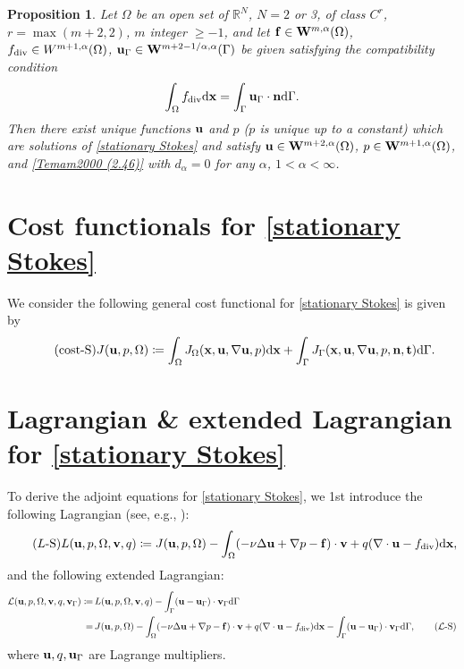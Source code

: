 \documentclass[oneside]{book}
\numberwithin{equation}{section}
\newtheorem{proposition}{Proposition}[section]
\begin{document}
\begin{proposition}
    Let $\Omega$ be an open set of $\mathbb{R}^N$, $N = 2$ or 3, of class $C^r$, $r = \max(m + 2,2)$, $m$ integer $\ge -1$, and let ${\bf f}\in{\bf W}^{m,\alpha}(\Omega)$, $f_{\rm div}\in W^{m+1,\alpha}(\Omega)$, ${\bf u}_\Gamma\in{\bf W}^{m + 2 - 1/\alpha,\alpha}(\Gamma)$ be given satisfying the compatibility condition
    \begin{align*}
        \int_\Omega f_{\rm div}{\rm d}{\bf x} = \int_\Gamma {\bf u}_\Gamma\cdot{\bf n}{\rm d}\Gamma.
    \end{align*}
    Then there exist unique functions ${\bf u}$ and $p$ ($p$ is unique up to a constant) which are solutions of \eqref{stationary Stokes} and satisfy ${\bf u}\in{\bf W}^{m+2,\alpha}(\Omega)$, $p\in{\bf W}^{m+1,\alpha}(\Omega)$, and \eqref{Temam2000 (2.46)} with $d_\alpha = 0$ for any $\alpha$, $1 < \alpha < \infty$.
\end{proposition}

\section{Cost functionals for \eqref{stationary Stokes}}
We consider the following general cost functional for \eqref{stationary Stokes} is given by
\begin{align}
    \label{cost functional for stationary Stokes}
    \tag{cost-S}
    J({\bf u},p,\Omega)\coloneqq\int_\Omega J_\Omega({\bf x},{\bf u},\nabla{\bf u},p){\rm d}{\bf x} + \int_\Gamma J_\Gamma({\bf x},{\bf u},\nabla{\bf u},p,{\bf n},{\bf t}){\rm d}\Gamma.
\end{align}

\section{Lagrangian \& extended Lagrangian for \eqref{stationary Stokes}}
To derive the adjoint equations for \eqref{stationary Stokes}, we 1st introduce the following Lagrangian (see, e.g., \cite{Troltzsch2010}):
\begin{align}
    \label{Lagrangian for stationary Stokes}
    \tag{$L$-S}
    L({\bf u},p,\Omega,{\bf v},q)\coloneqq J({\bf u},p,\Omega) - \int_\Omega (-\nu\Delta{\bf u} + \nabla p - {\bf f})\cdot{\bf v} + q(\nabla\cdot{\bf u} - f_{\rm div}){\rm d}{\bf x},
\end{align}
and the following extended Lagrangian:
\begin{align}
    \mathcal{L}({\bf u},p,\Omega,{\bf v},q,{\bf v}_\Gamma)\coloneqq&\,L({\bf u},p,\Omega,{\bf v},q) - \int_\Gamma ({\bf u} - {\bf u}_\Gamma)\cdot{\bf v}_\Gamma{\rm d}\Gamma\nonumber\\
    =&\, J({\bf u},p,\Omega) - \int_\Omega (-\nu\Delta{\bf u} + \nabla p - {\bf f})\cdot{\bf v} + q(\nabla\cdot{\bf u} - f_{\rm div}){\rm d}{\bf x} - \int_\Gamma ({\bf u} - {\bf u}_\Gamma)\cdot{\bf v}_\Gamma{\rm d}\Gamma,\label{extended Lagrangian for stationary Stokes}\tag{$\mathcal{L}$-S}
\end{align}
where ${\bf u},q,{\bf u}_\Gamma$ are Lagrange multipliers.
\end{document}
